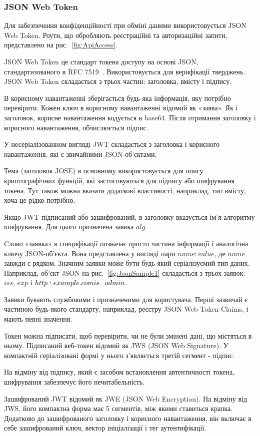 \subsubsection{JSON Web Token} \label{subsubsection:jwt}


Для забезпечення конфіденційності при обміні даними використовується JSON Web Token. Роути, що обробляють реєстраційні та авторизаційні запити, представлено на рис.~\ref{fig:ApiAccess}.

JSON Web Token це стандарт токена доступу на основі JSON, стандартизованого в RFC 7519~\cite{jones2015json}. Використовується для верифікації тверджень. JSON Web Token складається з трьох частин: заголовка, вмісту і підпису.

В корисному навантаженні зберігається будь-яка інформація, яку потрібно перевірити. Кожен ключ в корисному навантаженні відомий як «заява». Як і заголовок, корисне навантаження кодується в base64. Після отримання заголовку і корисного навантаження, обчислюється підпис.

У несеріалізованном вигляді JWT складається з заголовка і корисного навантаження, які є звичайними JSON-об'єктами.

Тема (заголовок JOSE) в основному використовується для опису криптографічних функцій, які застосовуються для підпису або шифрування токена. Тут також можна вказати додаткові властивості, наприклад, тип вмісту, хоча це рідко потрібно.

Якщо JWT підписаний або зашифрований, в заголовку вказується ім'я алгоритму шифрування. Для цього призначена заявка $alg$.

Cлово «заявка» в специфікації позначає просто частина інформації і аналогічна ключу JSON-об'єкта. Вона представлена у вигляді пари $name: value$, де $name$ завжди є рядком. Значним заявки може бути будь-який серіалізуємий тип даних. Наприклад, об'єкт JSON на рис.~\ref{fig:JsonSample1} складається з трьох заявок: $iss$, $exp$ і $http:\/\/example.com\/is\_admin$.


Заявки бувають службовими і призначеними для користувача. Перші зазвичай є частиною будь-якого стандарту, наприклад, реєстру JSON Web Token Claims, і мають певні значення.

Токен можна підписати, щоб перевірити, чи не були змінені дані, що містяться в ньому. Підписаний веб-токен відомий як JWS (JSON Web Signature). У компактній серіалізовані формі у нього з'являється третій сегмент - підпис.

На відміну від підпису, який є засобом встановлення автентичності токена, шифрування забезпечує його нечитабельність.

Зашифрований JWT відомий як JWE (JSON Web Encryption). На відміну від JWS, його компактна форма має 5 сегментів, між якими ставиться крапка. Додатково до зашифрованого заголовку і корисного навантаження, він включає в себе зашифрований ключ, вектор ініціалізації і тег аутентифікації.
